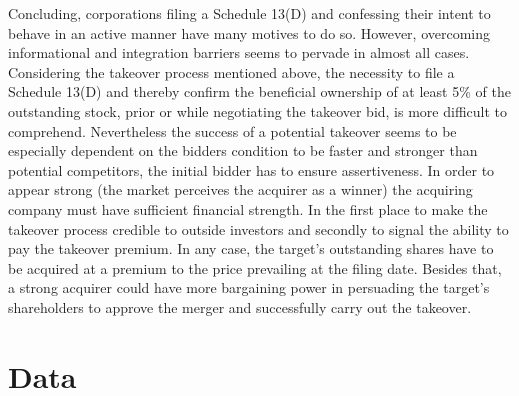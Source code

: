 \documentclass[12pt]{article}
\begin{document}
Concluding, corporations filing a Schedule 13(D) and confessing their intent to behave in an active manner have many motives to do so. However, overcoming informational and integration barriers seems to pervade in almost all cases. Considering the takeover process mentioned above, the necessity to file a Schedule 13(D) and thereby confirm the beneficial ownership of at least 5\% of the outstanding stock, prior or while negotiating the takeover bid, is more difficult to comprehend. 
Nevertheless the success of a potential takeover seems to be especially dependent on the bidders condition to be faster and stronger than potential competitors, the initial bidder has to ensure assertiveness. In order to appear strong (the market perceives the acquirer as a winner) the acquiring company must have sufficient financial strength. In the first place to make the takeover process credible to outside investors and secondly to signal the ability to pay the takeover premium. In any case, the target's outstanding shares have to be acquired at a premium to the price prevailing at the filing date. Besides that, a strong acquirer could have more bargaining power in persuading the target's shareholders to approve the merger and successfully carry out the takeover. 

\section{Data}
\end{document}
